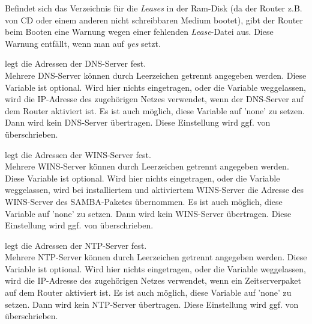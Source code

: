 \begin{description}
    {Befindet sich das Verzeichnis für die \emph{Leases} in der Ram-Disk (da der
    Router z.B. von CD oder einem anderen nicht schreibbaren Medium bootet), gibt
    der Router beim Booten eine Warnung wegen einer fehlenden \emph{Lease}-Datei aus.
    Diese Warnung entfällt, wenn man  auf \emph{yes} setzt.}


    {legt die Adressen der DNS-Server fest. \\
    Mehrere DNS-Server können durch Leerzeichen getrennt angegeben werden. 
    Diese Variable ist optional. 
    Wird hier nichts eingetragen, oder die Variable weggelassen,
    wird die IP-Adresse des zugehörigen Netzes verwendet, wenn der DNS-Server auf dem Router aktiviert ist.
    Es ist auch möglich, diese Variable auf 'none' zu setzen. Dann wird kein DNS-Server übertragen.
    Diese Einstellung wird ggf. von 
     überschrieben.}
    

    {legt die Adressen der WINS-Server fest. \\
    Mehrere WINS-Server können durch Leerzeichen getrennt angegeben werden. 
    Diese Variable ist optional. 
    Wird hier nichts eingetragen, oder die Variable weggelassen,
    wird bei installiertem und aktiviertem WINS-Server die Adresse des WINS-Server 
    des SAMBA-Paketes übernommen.
    Es ist auch möglich, diese Variable auf 'none' zu setzen. Dann wird kein WINS-Server übertragen.
    Diese Einstellung wird ggf. von 
     überschrieben.}

    
    {legt die Adressen der NTP-Server fest. \\
    Mehrere NTP-Server können durch Leerzeichen getrennt angegeben werden. 
    Diese Variable ist optional. 
    Wird hier nichts eingetragen, oder die Variable weggelassen,
    wird die IP-Adresse des zugehörigen Netzes verwendet, wenn ein
    Zeitserverpaket auf dem Router aktiviert ist.
    Es ist auch möglich, diese Variable auf 'none' zu setzen. Dann wird kein NTP-Server übertragen.
    Diese Einstellung wird ggf. von 
     überschrieben.}
    

\end{description}
